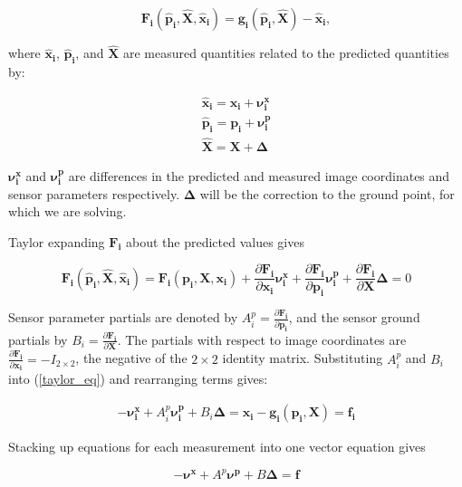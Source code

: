 \documentclass[10pt]{amsart}
\newcommand{\imgmeashat}{\pmb{\hat{x}_{i}}}
\newcommand{\imgmeas}{\pmb{x_{i}}}
\newcommand{\grndhat}{\pmb{\hat{X}}}
\newcommand{\grnd}{\pmb{X}}
\newcommand{\sensmeashat}{\pmb{\hat{p}_i}}
\newcommand{\sensmeas}{\pmb{p_i}}
\newcommand{\imgnu}{\pmb{\nu_{i}^x}}
\newcommand{\sensnu}{\pmb{\nu_i^p}}
\newcommand{\grndupdate}{\pmb{\Delta}}
\newcommand{\Fimgpartials}{\frac{\partial{\pmb{F_{i}}}}{\partial{\imgmeas}}}
\newcommand{\Fgrndpartials}{\frac{\partial{\pmb{F_{i}}}}{\partial{\grnd}}}
\newcommand{\Fsenspartials}{\frac{\partial{\pmb{F_{i}}}}{\partial{\sensmeas}}}
\begin{document}
\begin{equation*}
\pmb{F_{i}}(\sensmeashat, \grndhat,\imgmeashat)=\pmb{g_i}(\sensmeashat,\grndhat)-\imgmeashat,
\end{equation*}

where $\imgmeashat$, $\sensmeashat$, and $\grndhat$ are measured quantities
related to the predicted quantities by:

\begin{equation*}
\begin{split}
\imgmeashat = \imgmeas + \imgnu\\
\sensmeashat    = \sensmeas + \sensnu\\
\grndhat    = \grnd + \grndupdate
\end{split}
\end{equation*}

$\imgnu$ and $\sensnu$ are differences in the predicted and measured image
coordinates and sensor parameters respectively.  $\grndupdate$ will be the
correction to the ground point, for which we are solving.

Taylor expanding $\pmb{F_{i}}$ about the predicted values gives

\begin{equation} \label{taylor_eq}
\pmb{F_{i}}(\sensmeashat, \grndhat, \imgmeashat) = 
\pmb{F_{i}}(\sensmeas, \grnd, \imgmeas) + \Fimgpartials\imgnu + \Fsenspartials\sensnu + \Fgrndpartials\grndupdate = 0
\end{equation}

Sensor parameter partials are denoted by $A_{i}^p = \Fsenspartials$, and the
sensor ground partials by $B_{i} = \Fgrndpartials$.  The partials with respect
to image coordinates are ${\Fimgpartials=-I_{2 \times 2}}$, the negative of the
$2 \times 2$ identity matrix.  Substituting $A_{i}^p$ and $B_{i}$ into
(\ref{taylor_eq}) and rearranging terms gives:

\begin{equation} \label{linear_eq}
\begin{split}
-\imgnu + A_{i}^p\sensnu + B_{i}\grndupdate = \imgmeas - \pmb{g_i}(\sensmeas, \grnd) = \pmb{f_{i}}
\end{split}
\end{equation}

Stacking up equations for each measurement into one vector equation gives

\begin{equation}\label{stacked_eq}
-\pmb{\nu^x} + A^p\pmb{\nu^p} + B\grndupdate = \pmb{f}
\end{equation}
\end{document}
